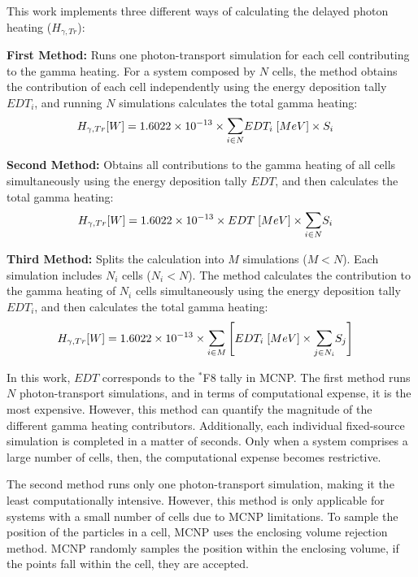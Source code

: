 This work implements three different ways of calculating the delayed photon heating ($H_{\gamma, Tr}$):

\noindent
\textbf{First Method:} Runs one photon-transport simulation for each cell contributing to the gamma heating.
For a system composed by $N$ cells, the method obtains the contribution of each cell independently using the energy deposition tally $EDT_i$, and running $N$ simulations calculates the total gamma heating:
\begin{align}
H_{\gamma, Tr} [W] &= 1.6022 \times 10^{-13} \times \mathlarger{\sum}_{i \in N} EDT_i \; [MeV] \times S_i
\end{align}

\noindent
\textbf{Second Method:} Obtains all contributions to the gamma heating of all cells simultaneously using the energy deposition tally $EDT$, and then calculates the total gamma heating:
\begin{align}
H_{\gamma, Tr} [W] &= 1.6022 \times 10^{-13} \times EDT \; [MeV] \times \mathlarger{\sum}_{i \in N} S_i
\end{align}

\noindent
\textbf{Third Method:} Splits the calculation into $M$ simulations ($M < N$).
Each simulation includes $N_i$ cells ($N_i < N$).
The method calculates the contribution to the gamma heating of $N_i$ cells simultaneously using the energy deposition tally $EDT_i$, and then calculates the total gamma heating:
\begin{align}
H_{\gamma, Tr} [W] &= 1.6022 \times 10^{-13} \times \mathlarger{\sum}_{i \in M} \left[ EDT_i \; [MeV] \times \mathlarger{\sum}_{j \in N_i} S_j \right]
\end{align}

In this work, $EDT$ corresponds to the $^\ast$F8 tally in MCNP.
The first method runs $N$ photon-transport simulations, and in terms of computational expense, it is the most expensive.
However, this method can quantify the magnitude of the different gamma heating contributors.
Additionally, each individual fixed-source simulation is completed in a matter of seconds.
Only when a system comprises a large number of cells, then, the computational expense becomes restrictive.

The second method runs only one photon-transport simulation, making it the least computationally intensive.
However, this method is only applicable for systems with a small number of cells due to MCNP limitations.
To sample the position of the particles in a cell, MCNP uses the enclosing volume rejection method.
MCNP randomly samples the position within the enclosing volume, if the points fall within the cell, they are accepted.

